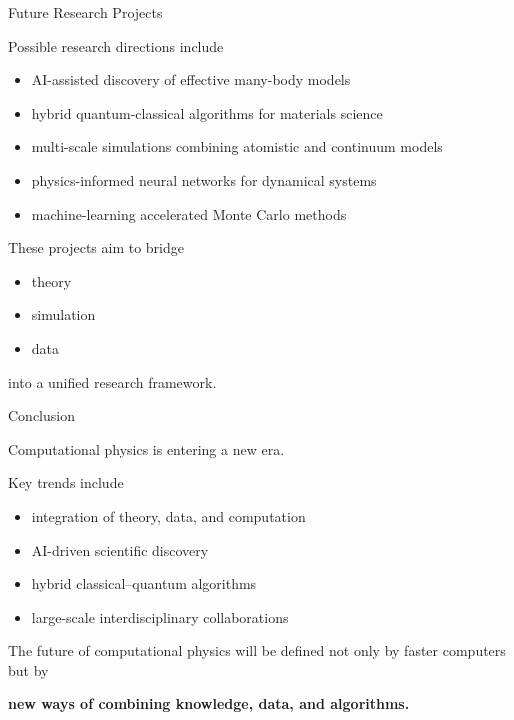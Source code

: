 \documentclass{beamer}
\begin{document}
\begin{frame}{Future Research Projects}

Possible research directions include

\begin{itemize}
\item AI-assisted discovery of effective many-body models
\item hybrid quantum-classical algorithms for materials science
\item multi-scale simulations combining atomistic and continuum models
\item physics-informed neural networks for dynamical systems
\item machine-learning accelerated Monte Carlo methods
\end{itemize}

These projects aim to bridge

\begin{itemize}
\item theory
\item simulation
\item data
\end{itemize}

into a unified research framework.

\end{frame}


\begin{frame}{Conclusion}

Computational physics is entering a new era.

Key trends include

\begin{itemize}
\item integration of theory, data, and computation
\item AI-driven scientific discovery
\item hybrid classical–quantum algorithms
\item large-scale interdisciplinary collaborations
\end{itemize}

The future of computational physics will be defined
not only by faster computers but by

\begin{center}
\textbf{new ways of combining knowledge, data, and algorithms.}
\end{center}

\end{frame}
\end{document}
